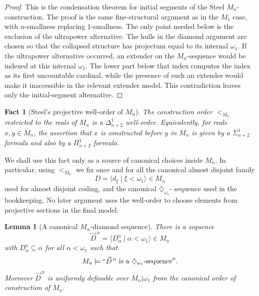 \documentclass[a4paper,11pt]{article}
\newtheorem{lemma}[theorem]{Lemma}
\newtheorem{fact}[theorem]{Fact}
\begin{document}
\begin{proof}
This is the condensation theorem for initial segments of the Steel $M_n$-construction.  The proof is the same fine-structural argument as in the $M_1$ case, with $n$-smallness replacing $1$-smallness.  The only point needed below is the exclusion of the ultrapower alternative.  The hulls in the diamond argument are chosen so that the collapsed structure has projectum equal to its internal $\omega_1$.  If the ultrapower alternative occurred, an extender on the $M_n$-sequence would be indexed at this internal $\omega_1$.  The lower part below that index computes the index as its first uncountable cardinal, while the presence of such an extender would make it inaccessible in the relevant extender model.  This contradiction leaves only the initial-segment alternative.
\end{proof}

\begin{fact}[Steel's projective well-order of $M_n$]\label{fact:mn-projective-wellorder}
The construction order $<_{M_n}$ restricted to the reals of $M_n$ is a $\Delta^1_{n+2}$ well-order.  Equivalently, for reals $x,y\in M_n$, the assertion that $x$ is constructed before $y$ in $M_n$ is given by a $\Sigma^1_{n+2}$ formula and also by a $\Pi^1_{n+2}$ formula.
\end{fact}

We shall use this fact only as a source of canonical choices inside \(M_n\).
In particular, using \(<_{M_n}\) we fix once and for all the canonical
almost disjoint family \[D=\langle d_\xi\mid \xi<\omega_1\rangle\in M_n\]
used for almost disjoint coding, and the canonical \(\diamondsuit_{\omega_1}\)-
sequence used in the bookkeeping.  No later argument uses the well-order
to choose elements from projective sections in the final model.



\begin{lemma}[A canonical $M_n$-diamond sequence]\label{lem:mn-diamond}
There is a sequence
\[
   \vec D^{\,n}=\langle D^n_\alpha\mid \alpha<\omega_1\rangle\in M_n
\]
with $D^n_\alpha\subseteq\alpha$ for all $\alpha<\omega_1$ such that
\[
   M_n\models ``\vec D^{\,n}\text{ is a }\diamondsuit_{\omega_1}\text{-sequence}''.
\]
Moreover $\vec D^{\,n}$ is uniformly definable over $M_n|\omega_1$ from the canonical order of construction of $M_n$.
\end{lemma}
\end{document}
